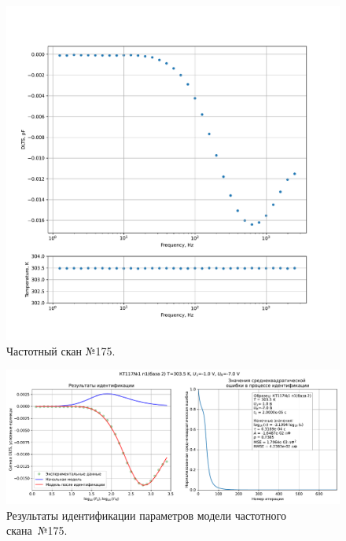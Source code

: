 \begin{figure}[!ht]
    \centering
    \includegraphics[width=1\textwidth]{../plots/КТ117№1_п1(база 2)_2500Гц-1Гц_1пФ_+30С_-1В-7В_200мВ_20мкс_шаг_0,1.pdf}
    \caption{Частотный скан №175.}
    \label{pic:frequency_scan_175}
\end{figure}

\begin{figure}[!ht]
    \centering
    \includegraphics[width=1\textwidth]{../plots/КТ117№1_п1(база 2)_2500Гц-1Гц_1пФ_+30С_-1В-7В_200мВ_20мкс_шаг_0,1_model.pdf}
    \caption{Результаты идентификации параметров модели частотного скана~№175.}
    \label{pic:frequency_scan_model175}
\end{figure}

\pagebreak


